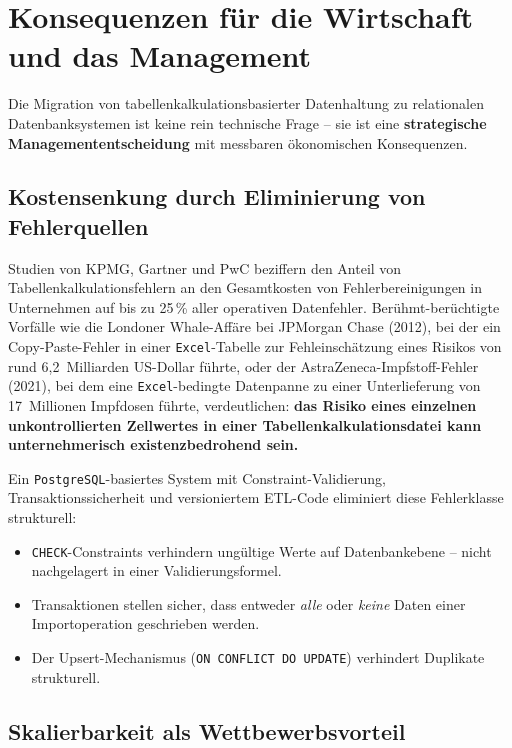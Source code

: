﻿\documentclass[12pt,a4paper]{report}
\theoremstyle{definition}
\theoremstyle{remark}
\newcommand{\excel}{\texttt{Excel}}
\newcommand{\pg}{\texttt{PostgreSQL}}
\newcommand{\code}[1]{\texttt{#1}}
\begin{document}
\section{Konsequenzen für die Wirtschaft und das Management}

Die Migration von tabellenkalkulationsbasierter Datenhaltung zu
relationalen Datenbanksystemen ist keine rein technische Frage --
sie ist eine \textbf{strategische Managemententscheidung} mit
messbaren ökonomischen Konsequenzen.

\subsection{Kostensenkung durch Eliminierung von Fehlerquellen}

Studien von KPMG, Gartner und PwC beziffern den Anteil von
Tabellenkalkulationsfehlern an den Gesamtkosten von Fehlerbereinigungen
in Unternehmen auf bis zu 25\,\% aller operativen Datenfehler.
Berühmt-berüchtigte Vorfälle wie die Londoner Whale-Affäre bei
JPMorgan Chase (2012), bei der ein Copy-Paste-Fehler in einer
\excel-Tabelle zur Fehleinschätzung eines Risikos von rund
6{,}2~Milliarden US-Dollar führte, oder der AstraZeneca-Impfstoff-Fehler
(2021), bei dem eine \excel-bedingte Datenpanne zu einer Unterlieferung
von 17~Millionen Impfdosen führte, verdeutlichen: \textbf{das Risiko
eines einzelnen unkontrollierten Zellwertes in einer
Tabellenkalkulationsdatei kann unternehmerisch existenzbedrohend sein.}

Ein \pg-basiertes System mit Constraint-Validierung,
Transaktionssicherheit und versioniertem ETL-Code eliminiert diese
Fehlerklasse strukturell:
\begin{itemize}[leftmargin=1.5em, itemsep=2pt]
  \item \code{CHECK}-Constraints verhindern ungültige Werte auf
        Datenbankebene -- nicht nachgelagert in einer Validierungsformel.
  \item Transaktionen stellen sicher, dass entweder \emph{alle} oder
        \emph{keine} Daten einer Importoperation geschrieben werden.
  \item Der Upsert-Mechanismus (\code{ON CONFLICT DO UPDATE}) verhindert
        Duplikate strukturell.
\end{itemize}

\subsection{Skalierbarkeit als Wettbewerbsvorteil}
\end{document}
